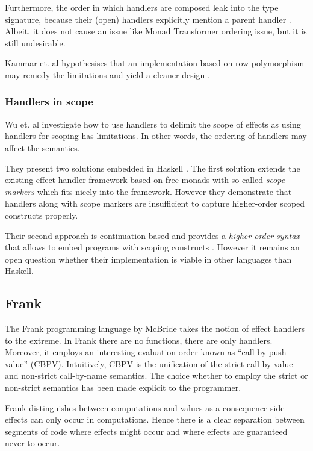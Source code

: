 Furthermore, the order in which handlers are composed leak into the type signature, because their (open) handlers explicitly mention a parent handler \cite{Kammar2013}. Albeit, it does not cause an issue like Monad Transformer ordering issue, but it is still undesirable.

Kammar et. al hypothesises that an implementation based on row polymorphism may remedy the limitations and yield a cleaner design \cite{Kammar2013}.

\subsubsection{Handlers in scope}
Wu et. al investigate how to use handlers to delimit the scope of effects \cite{Wu2014} as using handlers for scoping has limitations. In other words, the ordering of handlers may affect the semantics. 

They present two solutions embedded in Haskell \cite{Wu2014}. The first solution extends the existing effect handler framework based on free monads with so-called \emph{scope markers} which fits nicely into the framework. However they demonstrate that handlers along with scope markers are insufficient to capture higher-order scoped constructs properly.

Their second approach is continuation-based and provides a \emph{higher-order syntax} that allows to embed programs with scoping constructs \cite{Wu2014}. However it remains an open question whether their implementation is viable in other languages than Haskell.

\subsection{Frank}
The Frank programming language by McBride \cite{McBride2014} takes the notion of effect handlers to the extreme. In Frank there are no functions, there are only handlers. Moreover, it employs an interesting evaluation order known as ``call-by-push-value'' (CBPV). Intuitively, CBPV is the unification of the strict call-by-value and non-strict call-by-name semantics. The choice whether to employ the strict or non-strict semantics has been made explicit to the programmer.

Frank distinguishes between computations and values as a consequence side-effects can only occur in computations. Hence there is a clear separation between segments of code where effects might occur and where effects are guaranteed never to occur.

